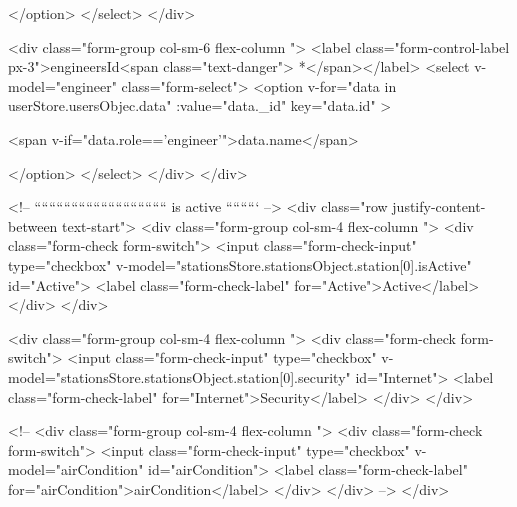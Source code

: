                                     
                                    </option>
                                </select>
                            </div>

                            <div class="form-group col-sm-6 flex-column "> <label
                                    class="form-control-label px-3">engineersId<span class="text-danger"> *</span></label>
                                    <select v-model="engineer" class="form-select">
                                        <option v-for="data in userStore.usersObjec.data" :value="data._id" key="data.id" >
                                       
                                        <span v-if="data.role=='engineer'">{{data.name}}</span>
                                    
                                    </option>
                                </select>
                            </div>
                        </div>

                        <!-- ```````````````````````````````````` is active ````````` -->
                        <div class="row justify-content-between text-start">
                            <div class="form-group col-sm-4 flex-column ">
                                <div class="form-check form-switch">
                                    <input class="form-check-input" type="checkbox" v-model="stationsStore.stationsObject.station[0].isActive" id="Active">
                                    <label class="form-check-label" for="Active">Active</label>
                                </div>
                            </div>

                            <div class="form-group col-sm-4 flex-column ">
                                <div class="form-check form-switch">
                                    <input class="form-check-input" type="checkbox" v-model="stationsStore.stationsObject.station[0].security" id="Internet">
                                    <label class="form-check-label" for="Internet">Security</label>
                                </div>
                            </div>

                            <!-- <div class="form-group col-sm-4 flex-column ">
                                <div class="form-check form-switch">
                                    <input class="form-check-input" type="checkbox" v-model="airCondition" id="airCondition">
                                    <label class="form-check-label" for="airCondition">airCondition</label>
                                </div>
                            </div> -->
                        </div>
                       
